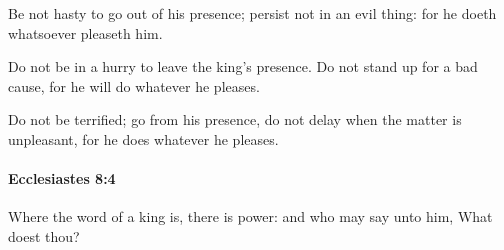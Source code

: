 			\begin{versebox}
					\item[BHS] 
					\item[LXX] 
					\item[ASV] Be not hasty to go out of his presence; persist not in an evil thing: for he doeth whatsoever pleaseth him.
					\item[NIV] Do not be in a hurry to leave the king’s presence. Do not stand up for a bad cause, for he will do whatever he pleases.
					\item[NRSV] Do not be terrified; go from his presence, do not delay when the matter is unpleasant, for he does whatever he pleases.
			\end{versebox}

		\paragraph{Ecclesiastes 8:4} %
			\label{ECCLESIASTES-8-4}

			Where the word of a king is, there is power: and who may say unto him, What doest thou?

